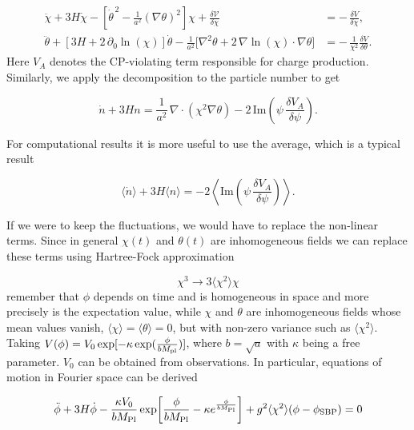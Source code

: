 \begin{align}
\ddot{\chi} + 3H\dot{\chi}
-\left[\dot{\theta}^{\,2}-\frac{1}{a^{2}}(\nabla\theta)^{2}\right]\chi
+\frac{\delta \mathcal{V}}{\delta \chi}
&= -\,\frac{\delta V}{\delta \chi},
\\[6pt]
\ddot{\theta}
+\left[3H + 2\,\partial_{0}\ln(\chi)\right]\dot{\theta}
-\frac{1}{a^{2}}\Big[\nabla^{2}\theta + 2\,\nabla\ln(\chi)\cdot\nabla\theta\Big]
&= -\,\frac{1}{\chi^{2}}\frac{\delta V}{\delta \theta}.
\end{align}
Here $V_A$ denotes the CP-violating term responsible for charge production. Similarly, we apply the decomposition to the particle number to get

\begin{equation}
\dot{n} + 3Hn
= \frac{1}{a^{2}}\,\nabla\cdot\left(\chi^{2}\nabla\theta\right)
- 2\,\mathrm{Im}\!\left(\psi\,\frac{\delta V_A}{\delta\psi}\right).
\end{equation}

For computational results it is more useful to use the average, which is a typical result

\begin{equation}
\langle \dot{n} \rangle + 3H \langle n \rangle
= -2 \left\langle \mathrm{Im}\!\left(\psi\,\frac{\delta V_A}{\delta\psi}\right) \right\rangle .
\end{equation}

If we were to keep the fluctuations, we would have to replace the non-linear terms. Since in general $\chi(t)$ and $\theta(t)$ are inhomogeneous fields we can replace these terms using Hartree-Fock approximation

\begin{equation}
    \chi^3 \rightarrow 3 \langle \chi^2 \rangle \chi
\end{equation}
remember that $\phi$ depends on time and is homogeneous in space and more precisely is the expectation value, while $\chi$ and $\theta$ are inhomogeneous fields whose mean values vanish, $\langle \chi \rangle = \langle \theta \rangle = 0$, but with non-zero variance such as $\langle \chi^2 \rangle$. Taking $V(\phi) = V_0 \exp [- \kappa \exp(\frac{\phi}{b M_{\rm pl}})]$, where $b = \sqrt{a}$ with $\kappa$ being a free parameter. $V_0$ can be obtained from observations. In particular, equations of motion in Fourier space can be derived

\begin{equation}
\ddot{\phi} + 3H \dot{\phi}
 - \frac{\kappa V_0}{b M_{\rm Pl}}
 \exp\!\left[\frac{\phi}{b M_{\rm Pl}} - \kappa e^{\frac{\phi}{b M_{\rm Pl}}}\right]
 + g^2 \langle \chi^2 \rangle (\phi - \phi_{\rm SBP}) = 0
\end{equation}

